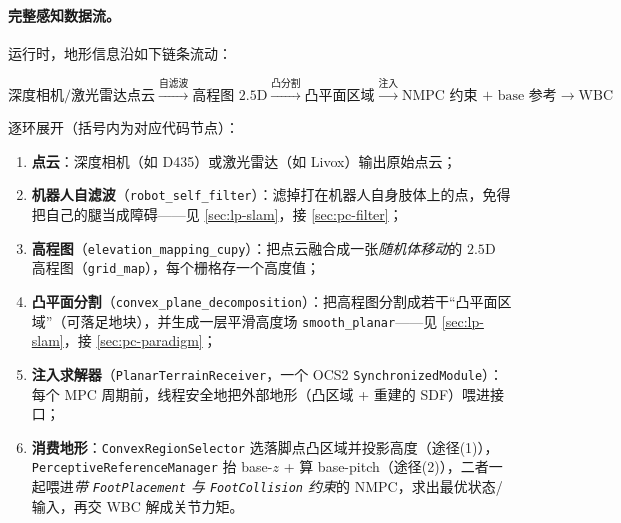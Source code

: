 \paragraph{完整感知数据流。}
运行时，地形信息沿如下链条流动：

\begin{equation*}
\boxed{\text{深度相机/激光雷达点云}} \xrightarrow{\text{自滤波}} \boxed{\text{高程图 }2.5\text{D}} \xrightarrow{\text{凸分割}} \boxed{\text{凸平面区域}} \xrightarrow{\text{注入}} \boxed{\text{NMPC 约束 + base 参考}} \xrightarrow{} \boxed{\text{WBC}}
\end{equation*}

逐环展开（括号内为对应代码节点）：
\begin{enumerate}
  \item \textbf{点云}：深度相机（如 D435）或激光雷达（如 Livox）输出原始点云；
  \item \textbf{机器人自滤波}（\texttt{robot\_self\_filter}）：滤掉打在机器人自身肢体上的点，免得把自己的腿当成障碍——见 \cref{sec:lp-slam}，接 \cref{sec:pc-filter}；
  \item \textbf{高程图}（\texttt{elevation\_mapping\_cupy}）：把点云融合成一张\emph{随机体移动}的 $2.5$D 高程图（\texttt{grid\_map}），每个栅格存一个高度值；
  \item \textbf{凸平面分割}（\texttt{convex\_plane\_decomposition}）：把高程图分割成若干“凸平面区域”（可落足地块），并生成一层平滑高度场 \texttt{smooth\_planar}——见 \cref{sec:lp-slam}，接 \cref{sec:pc-paradigm}；
  \item \textbf{注入求解器}（\texttt{PlanarTerrainReceiver}，一个 OCS2 \texttt{SynchronizedModule}）：每个 MPC 周期前，线程安全地把外部地形（凸区域 + 重建的 SDF）喂进接口；
  \item \textbf{消费地形}：\texttt{ConvexRegionSelector} 选落脚点凸区域并投影高度（途径(1)），\texttt{PerceptiveReferenceManager} 抬 base-$z$ + 算 base-pitch（途径(2)），二者一起喂进\emph{带 \texttt{FootPlacement} 与 \texttt{FootCollision} 约束}的 NMPC，求出最优状态/输入，再交 WBC 解成关节力矩。
\end{enumerate}

